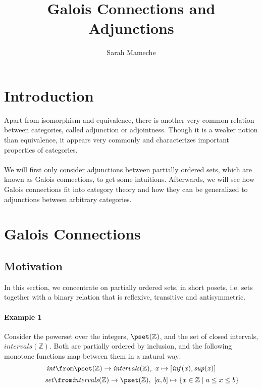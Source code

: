 \def\pathToRoot{../}
\usepackage{charter}
\selectfont


\title{Galois Connections and Adjunctions}
\author{Sarah Mameche}
\maketitle

\section*{Introduction}
	
	Apart from isomorphism and equivalence, there is another very common relation between categories, called adjunction or adjointness. Though it is a weaker notion than equivalence, it appears very commonly and characterizes important properties of categories.\\\\We will first only consider adjunctions between partially ordered sets, which are known as Galois connections, to get some intuitions. Afterwards, we will see how Galois connections fit into category theory and how they can be generalized to adjunctions between arbitrary categories.\\
\section*{Galois Connections}

\subsection*{Motivation}
	In this section, we concentrate on partially ordered sets, in short posets, i.e. sets together with a binary relation that is reflexive, transitive and antisymmetric.\\ 
\paragraph{Example 1}
	Consider the powerset over the integers, $\pset({\mathbb{Z}})$,  and the set of closed intervals, $\mathit{intervals}({\mathbb{Z}})$. Both are partially ordered by inclusion, and the following monotone functions map between them in a natural way:
	\[\mathit{int} \from \pset({\mathbb{Z}}) \to \mathit{intervals}({\mathbb{Z}}), \,\, x \mapsto [\mathit{inf(x)}, \mathit{sup(x)}]\]
	\[\;\;\;\;\;\;\;\;\;\;\;\mathit{set} \from  \mathit{intervals}({\mathbb{Z}}) \to\pset({\mathbb{Z}}), \,\, [a, b] \mapsto \{x \in \mathbb{Z} \mid a \leq x \leq b \}\]

